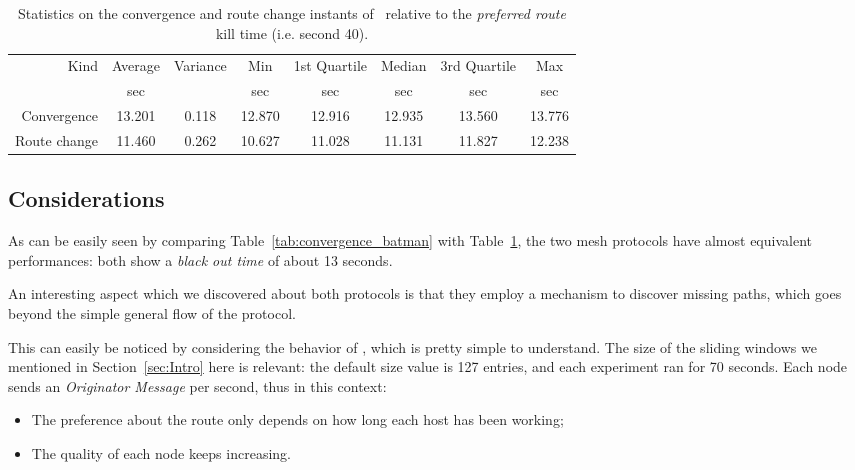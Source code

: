        \begin{table}[htbp]
            \centering
            \begin{tabular}{rccccccc}
            \toprule
            Kind & Average & Variance & Min & 1st Quartile &
            Median & 3rd Quartile & Max \\
            & \footnotesize{sec} & & \footnotesize{sec} & \footnotesize{sec} &
            \footnotesize{sec} & \footnotesize{sec} & \footnotesize{sec} \\
            \midrule
            Convergence & 13.201 & 0.118 & 12.870 & 12.916 & 12.935 & 13.560 &13.776 \\
            Route change & 11.460 & 0.262 & 10.627 & 11.028 & 11.131 &11.827 & 12.238 \\
            \bottomrule
            \end{tabular}
            \caption{Statistics on the convergence and route change
              instants of \olsr\ relative to the \emph{preferred
                route} kill time (i.e. second 40).}
           \label{tab:convergence_olsr}
        \end{table}

\subsection{Considerations}

As can be easily seen by comparing Table~\ref{tab:convergence_batman}
with Table~\ref{tab:convergence_olsr}, the two mesh protocols
have almost equivalent performances: both show a
\emph{black out time} of about 13 seconds.

%

An interesting aspect which we discovered about both protocols is that
they employ a mechanism to discover missing paths, which goes
beyond the simple general flow of the protocol.

This can easily be noticed by considering the behavior of \batman, which
is pretty simple to understand. The size of the sliding windows we
mentioned in Section~\ref{sec:Intro} here is relevant: the default size
value is 127 entries, and each experiment ran for 70 seconds. Each node
sends an \emph{Originator Message} per second, thus in this context:
\begin{itemize}
\item   The preference about the route only depends on how long each host
        has been working;
\item   The quality of each node keeps increasing.
\end{itemize}

